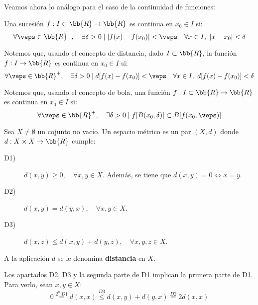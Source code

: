 Veamos ahora lo análogo para el caso de la continuidad de funciones:
\begin{definicion}
    Una sucesión $f:I\subset \bb{R}\to \bb{R}$ es continua en $x_0\in I$ si:
    \begin{equation*}
        \forall \veps\in \bb{R}^+,\quad \exists \delta>0 \mid |f(x)-f(x_0)|<\veps \quad \forall x\in I,~|x-x_0|< \delta 
    \end{equation*}
\end{definicion}

\begin{observacion}
    Notemos que, usando el concepto de distancia, dado $I\subset \bb{R}$, la función $f:I\to \bb{R}$ es continua en $x_0\in I$ si:
    \begin{equation*}
        \forall \veps\in \bb{R}^+,\quad \exists \delta>0 \mid d[f(x)-f(x_0)]<\veps \quad \forall x\in I,~d[f(x)-f(x_0)]< \delta 
    \end{equation*}

    Notemos que, usando el concepto de bola, una función $f:I\subset \bb{R}\to \bb{R}$ es continua en $x_0\in I$ si:
        \begin{equation*}
            \forall \veps\in \bb{R}^+,\quad \exists \delta>0 \mid f[B(x_0,\delta)]\subset B[f(x_0,\veps)]
        \end{equation*}
\end{observacion}


\begin{definicion} 
    Sea $X\neq \emptyset$ un cojunto no vacío. Un espacio métrico es un par $(X,d)$ donde $d:X\times X\to \bb{R}$ cumple:
    \begin{description}
        \item[D1)] $d(x,y)\geq 0, \quad \forall x,y\in X$. Además, se tiene que $d(x,y)=0\Longleftrightarrow x=y$.

        \item[D2)] $d(x,y)=d(y,x), \quad \forall x,y\in X$.

        \item[D3)] $d(x,z)\leq d(x,y)+d(y,z),\quad \forall x,y,z\in X$.
    \end{description}

    A la aplicación $d$ se le denomina \textbf{distancia} en $X$.
\end{definicion}

\begin{observacion}
    Los apartados D2, D3 y la segunda parte de D1 implican la primera parte de D1. Para verlo, sean $x,y\in X$:
    \begin{equation*}
        0\stackrel{2^a~D1}{=} d(x,x) \stackrel{D3}\leq d(x,y) + d(y,x) \stackrel{D2}{=} 2d(x,x)
    \end{equation*}
\end{observacion}

